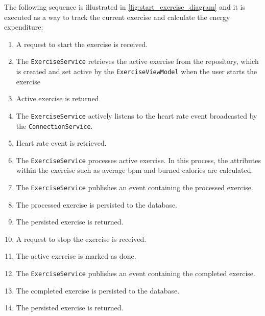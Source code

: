 The following sequence is illustrated in \autoref{fig:start_exercise_diagram} and it is executed as a way to track the current exercise and calculate the energy expenditure:
\begin{enumerate}
    \item A request to start the exercise is received.
    \item The \texttt{ExerciseService} retrieves the active exercise from the repository, which is created and set active by the \texttt{ExerciseViewModel} when the user starts the exercise
    \item Active exercise is returned
    \item The \texttt{ExerciseService} actively listens to the heart rate event broadcasted by the \texttt{ConnectionService}.
    \item Heart rate event is retrieved.
    \item The \texttt{ExerciseService} processes active exercise. In this process, the attributes within the exercise such as average bpm and burned calories are calculated.
    \item The \texttt{ExerciseService} publishes an event containing the processed exercise.
    \item The processed exercise is persisted to the database.
    \item The persisted exercise is returned.
    \item A request to stop the exercise is received.
    \item The active exercise is marked as done.
    \item The \texttt{ExerciseService} publishes an event containing the completed exercise.
    \item The completed exercise is persisted to the database.
    \item The persisted exercise is returned.
\end{enumerate}

